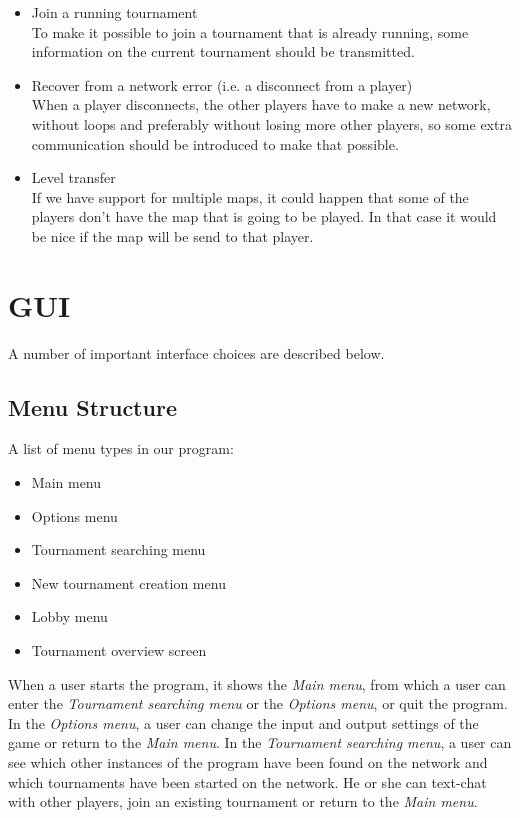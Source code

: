\documentclass[a4paper,twoside,11pt]{article}
\begin{document}
\begin{itemize}
 \item Join a running tournament \\
 To make it possible to join a tournament that is already running, some information on the current tournament should be transmitted.
 \item Recover from a network error (i.e. a disconnect from a player) \\
 When a player disconnects, the other players have to make a new network, without loops and preferably without losing more other players, so some extra communication should be introduced to make that possible.
 \item Level transfer \\
 If we have support for multiple maps, it could happen that some of the players don't have the map that is going to be played. In that case it would be nice if the map will be send to that player.
\end{itemize}


\newpage
\section{GUI}

A number of important interface choices are described below.

\subsection{Menu Structure}
A list of menu types in our program:

\begin{itemize}
    \item Main menu
    \item Options menu
    \item Tournament searching menu
    \item New tournament creation menu
    \item Lobby menu
    \item Tournament overview screen
\end{itemize}

When a user starts the program, it shows the \emph{Main menu}, from which a user can enter the \emph{Tournament searching menu} or the \emph{Options menu}, or quit the program. In the \emph{Options menu}, a user can change the input and output settings of the game or return to the \emph{Main menu}. In the \emph{Tournament searching menu}, a user can see which other instances of the program have been found on the network and which tournaments have been started on the network. He or she can text-chat with other players, join an existing tournament or return to the \emph{Main menu}.
\end{document}
